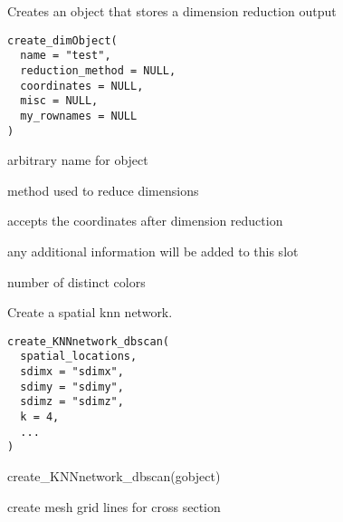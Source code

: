 \documentclass[a4paper]{book}
\begin{document}
%
\begin{Description}\relax
Creates an object that stores a dimension reduction output
\end{Description}
%
\begin{Usage}
\begin{verbatim}
create_dimObject(
  name = "test",
  reduction_method = NULL,
  coordinates = NULL,
  misc = NULL,
  my_rownames = NULL
)
\end{verbatim}
\end{Usage}
%
\begin{Arguments}
\begin{ldescription}
\item[\code{name}] arbitrary name for object

\item[\code{reduction\_method}] method used to reduce dimensions

\item[\code{coordinates}] accepts the coordinates after dimension reduction

\item[\code{misc}] any additional information will be added to this slot
\end{ldescription}
\end{Arguments}
%
\begin{Value}
number of distinct colors
\end{Value}
%
\begin{Description}\relax
Create a spatial knn network.
\end{Description}
%
\begin{Usage}
\begin{verbatim}
create_KNNnetwork_dbscan(
  spatial_locations,
  sdimx = "sdimx",
  sdimy = "sdimy",
  sdimz = "sdimz",
  k = 4,
  ...
)
\end{verbatim}
\end{Usage}
%
\begin{Examples}
\begin{ExampleCode}
    create_KNNnetwork_dbscan(gobject)
\end{ExampleCode}
\end{Examples}
%
\begin{Description}\relax
create mesh grid lines for cross section
\end{Description}
\end{document}
